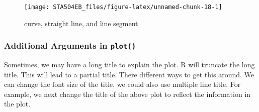 \documentclass[
]{book}
\begin{document}
\begin{figure}

{\centering \texttt{[image: STA504EB\_files/figure-latex/unnamed-chunk-18-1]} 

}

\caption{curve, straight line, and line segment}\label{fig:unnamed-chunk-18}
\end{figure}

\hypertarget{additional-arguments-in-plot}{%
\subsubsection{\texorpdfstring{Additional Arguments in \texttt{plot()}}{Additional Arguments in plot()}}\label{additional-arguments-in-plot}}

Sometimes, we may have a long title to explain the plot. R will truncate the long title. This will lead to a partial title. There different ways to get this around. We can change the font size of the title, we could also use multiple line title. For example, we next change the title of the above plot to reflect the information in the plot.
\end{document}
